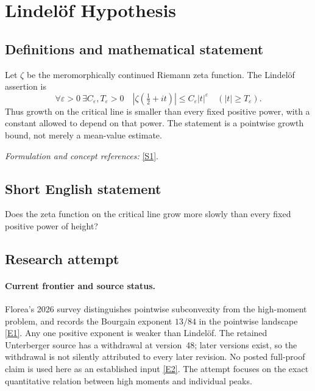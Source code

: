 \documentclass[11pt,a4paper]{article}
\numberwithin{equation}{section}
\newcommand{\sref}[2]{\hyperlink{source:#1:#2}{[S#2]}}
\newcommand{\eref}[2]{\hyperlink{extra:#1:#2}{[E#2]}}
\newif\ifshowcatalogue
\newcommand{\cataloguescope}[1]{\ifshowcatalogue
 \paragraph{Exact scope in the supplied catalogue.}
 \begin{quote}\small #1\end{quote}\fi}
\begin{document}
\setcounter{section}{0}
\section*{\texorpdfstring{Lindelöf Hypothesis}{Lindelöf Hypothesis}}\label{statement}
\subsection{Definitions and mathematical statement}
Let $\zeta$ be the meromorphically continued Riemann zeta function. The Lindelöf assertion is
\[
 \forall\varepsilon>0\ \exists C_\varepsilon,T_\varepsilon>0\quad
 |\zeta(\tfrac12+it)|\le C_\varepsilon|t|^\varepsilon
 \quad(|t|\ge T_\varepsilon).
\]
Thus growth on the critical line is smaller than every fixed positive power, with a constant allowed to depend on that power. The statement is a pointwise growth bound, not merely a mean-value estimate.
\par\smallskip\textit{Formulation and concept references:} \sref{statement}{1}.
\cataloguescope{Prove that for every epsilon>0 there is a constant C\_epsilon such that |zeta(1/2+it)| <= C\_epsilon |t|\textasciicircum{}epsilon for all sufficiently large real |t|.}
\subsection{Short English statement}
Does the zeta function on the critical line grow more slowly than every fixed positive power of height?
\subsection{Research attempt}

\paragraph{Current frontier and source status.}
Florea's 2026 survey distinguishes pointwise subconvexity from the high-moment
problem, and records the Bourgain exponent $13/84$ in the pointwise
landscape \eref{statement}{1}. Any one positive exponent is weaker than Lindel\"of.
The retained Unterberger source has a withdrawal at version~48; later
versions exist, so the withdrawal is not silently attributed to every
later revision. No posted full-proof claim is used here as an established
input \eref{statement}{2}. The attempt focuses on the exact quantitative relation
between high moments and individual peaks.
\end{document}
